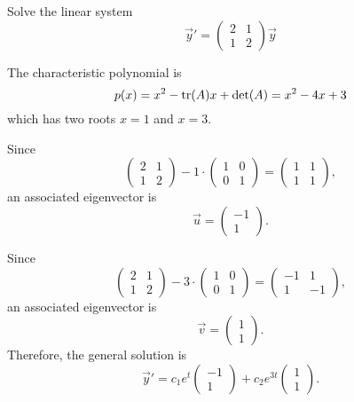 \begin{example}
  Solve the linear system
  \[
  \vec{y}'=\begin{pmatrix}
    2 & 1\\
    1 & 2
  \end{pmatrix}\vec{y}  
  \]
\end{example}
\begin{solution}
  The characteristic polynomial is
  \[
  p(x)=x^2-\operatorname{tr}(A)x+\det(A)=x^2-4x+3  
  \]
  which has two roots $x=1$ and $x=3$.
  
  Since
  \[
    \begin{pmatrix}
      2 & 1\\
      1 & 2
    \end{pmatrix}- 1\cdot 
  \begin{pmatrix}
    1 & 0\\
    0 & 1
  \end{pmatrix}  
  =
  \begin{pmatrix}
    1 & 1\\
    1 & 1
  \end{pmatrix},
  \]
  an associated eigenvector is
  \[
  \vec{u}=
  \begin{pmatrix}
    -1 \\ 1
  \end{pmatrix}.  
  \]

  Since
  \[
    \begin{pmatrix}
      2 & 1\\
      1 & 2
    \end{pmatrix}- 3\cdot 
  \begin{pmatrix}
    1 & 0\\
    0 & 1
  \end{pmatrix}  
  =
  \begin{pmatrix}
    -1 & 1\\
    1 & -1
  \end{pmatrix},
  \]
  an associated eigenvector is
  \[
  \vec{v}=
  \begin{pmatrix}
    1 \\ 1
  \end{pmatrix}.  
  \]
Therefore, the general solution is
\[
\vec{y}'=c_1e^t\begin{pmatrix}
  -1 \\ 1
\end{pmatrix}  + c_2e^{3t}
\begin{pmatrix}
  1 \\ 1
\end{pmatrix}.
\]
\end{solution}

